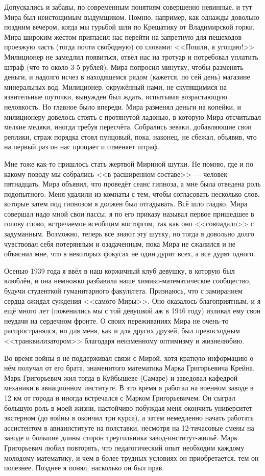 Допускались и забавы, по современным понятиям совершенно невинные,
и тут Мира был неистощимым выдумщиком.
Помню, например, как однажды довольно поздним вечером, когда мы гурьбой шли по Крещатику от Владимирской горки,
Мира широким жестом пригласил нас перейти на запретную для пешеходов проезжую часть
(тогда почти свободную) со словами: <<Пошли, я угощаю!>>
Милиционер не замедлил появиться, отвёл нас на тротуар и потребовал уплатить штраф (что-то около 3-5 рублей).
Мира попросил минутку, чтобы разменять деньги, и надолго исчез в находящемся рядом (кажется, по сей день)
магазине минеральных вод. Милиционер, окружённый нами, не скупящимися на язвительные шуточки,
вынужден был ждать, испытывая возрастающую неловкость.
Но главное было впереди. Мира разменял деньги на копейки, и милиционеру довелось стоять с протянутой ладонью, в которую Мира отсчитывал мелкие медяки, иногда требуя пересчёта. Собрались зеваки, добавляющие свои реплики, страж порядка стоял пунцовый, пока, наконец, не сбежал, объявив, что на первый раз он нас прощает и отменяет штраф.

Мне тоже как-то пришлось стать жертвой Мириной шутки.
Не помню, где и по какому поводу мы собрались <<в расширенном составе>> --- человек пятнадцать.
Мира объявил, что проведёт сеанс гипноза, а мне была отведена роль подопытного.
Меня удалили из комнаты с тем, чтобы согласовать несколько слов, которые затем под гипнозом я должен был отгадывать.
Всё шло гладко, Мира совершал надо мной свои пассы, я по его приказу называл первое пришедшее в голову слово,
встречаемое всеобщим восторгом, так как оно <<совпадало>> с задуманным.
Возможно, теперь все знают эту шутку, но тогда я довольно долго чувствовал себя потерянным и озадаченным,
пока Мира не сжалился и не объяснил мне, что в некоторых фокусах не один дурит всех, а все дурят одного.

Осенью 1939 года я ввёл в наш коржичный клуб девушку, в которую был влюблён, и она немножко разбавила наше химико-математическое сообщество, будучи студенткой гуманитарного факультета. Признаюсь, что с замиранием сердца ожидал суждения <<самого Миры>>. Оно оказалось благоприятным, и я ещё много лет (поженились мы с той девушкой аж в 1946 году) изливал ему свои неудачи на сердечном фронте. О своих переживаниях Мира не очень-то распространялся, но для меня, как и для других друзей, был превосходным <<транквилизатором>> благодаря неизменному оптимизму и жизнелюбию.

Во время войны я не поддерживал связи с Мирой, хотя краткую информацию о нём получал от его брата, знаменитого математика Марка Григорьевича Крейна. Марк Григорьевич жил тогда в Куйбышеве (Самаре) и заведовал кафедрой механики в авиационном институте. В это время я работал на военном заводе в 12 км от города и иногда встречался с Марком Григорьевичем. Он сыграл большую роль в моей жизни, настойчиво побуждая меня окончить университет экстерном (до войны я окончил три курса), а затем немедленно начать работать ассистентом в авиаинституте на полставки, несмотря на 12-тичасовые смены на заводе и большие длины сторон треугольника завод-институт-жильё. Марк Григорьевич любил повторять, что педагогический опыт необходим каждому молодому математику, и чем в более трудных условиях он приобретается, тем он полезнее. Позднее я понял, насколько он был прав.

